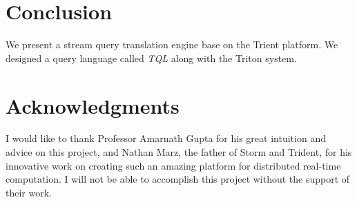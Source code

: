 \documentclass[conference, twocolumn, twoside, 11pt]{IEEEtran}
\theoremstyle{definition}
\begin{document}
\section{Conclusion}
We present a stream query translation engine base on the Trient platform. We designed a query language called \emph{TQL} along with the Triton system.


\section*{Acknowledgments}
I would like to thank Professor Amarnath Gupta for his great intuition and advice on this project,
and Nathan Marz, the father of Storm and Trident, for his innovative work on creating such an amazing platform for distributed real-time computation.
I will not be able to accomplish this project without the support of their work.


\end{document}
